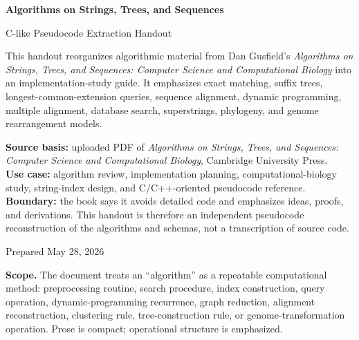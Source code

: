 \documentclass[11pt]{article}
\begin{document}
\hypersetup{pageanchor=false}

\begin{titlepage}
  \centering
  \vspace*{1.55cm}
  {\Huge\bfseries\color{ASTSBlue}Algorithms on Strings, Trees, and Sequences\par}
  \vspace{0.45cm}
  {\LARGE C-like Pseudocode Extraction Handout\par}
  \vspace{1.15cm}
  \begin{scopebox}
  This handout reorganizes algorithmic material from Dan Gusfield's \textit{Algorithms on Strings, Trees, and Sequences: Computer Science and Computational Biology} into an implementation-study guide. It emphasizes exact matching, suffix trees, longest-common-extension queries, sequence alignment, dynamic programming, multiple alignment, database search, superstrings, phylogeny, and genome rearrangement models.
  \end{scopebox}
  \vspace{0.85cm}
  \begin{methodbox}
  \textbf{Source basis:} uploaded PDF of \textit{Algorithms on Strings, Trees, and Sequences: Computer Science and Computational Biology}, Cambridge University Press.\\
  \textbf{Use case:} algorithm review, implementation planning, computational-biology study, string-index design, and C/C++-oriented pseudocode reference.\\
  \textbf{Boundary:} the book says it avoids detailed code and emphasizes ideas, proofs, and derivations. This handout is therefore an independent pseudocode reconstruction of the algorithms and schemas, not a transcription of source code.
  \end{methodbox}
  \vfill
  {\large Prepared May 28, 2026\par}
\end{titlepage}

\hypersetup{pageanchor=true}
\tableofcontents
\clearpage
{}

\begin{scopebox}
\textbf{Scope.} The document treats an ``algorithm'' as a repeatable computational method: preprocessing routine, search procedure, index construction, query operation, dynamic-programming recurrence, graph reduction, alignment reconstruction, clustering rule, tree-construction rule, or genome-transformation operation. Prose is compact; operational structure is emphasized.
\end{scopebox}
\end{document}

